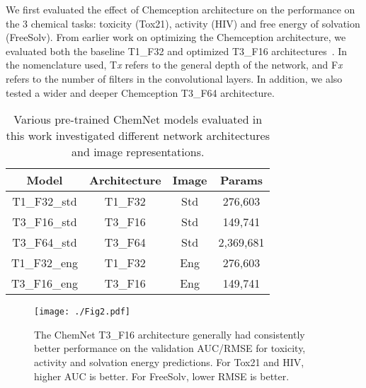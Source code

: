 \documentclass[sigconf]{acmart}
\begin{document}
We first evaluated the effect of Chemception architecture on the performance on the 3 chemical tasks: toxicity (Tox21), activity (HIV) and free energy of solvation (FreeSolv). From earlier work on optimizing the Chemception architecture, we evaluated both the baseline T1\_F32 and optimized T3\_F16 architectures~\cite{goh2017c1}. In the nomenclature used, T\textit{x} refers to the general depth of the network, and F\textit{x} refers to the number of filters in the convolutional layers. In addition, we also tested a wider and deeper Chemception T3\_F64 architecture.

\begin{table}[!t] 
		\begin{center}
		\begin{tabular}{|c|c|c|c|}
				\hline
				Model & Architecture & Image & Params \\
				\hline\hline
				T1\_F32\_std & T1\_F32 & Std & 276,603\\
				T3\_F16\_std & T3\_F16 & Std & 149,741\\
				T3\_F64\_std & T3\_F64 & Std & 2,369,681\\
				T1\_F32\_eng & T1\_F32 & Eng & 276,603\\
				T3\_F16\_eng & T3\_F16 & Eng & 149,741\\
				\hline
		\end{tabular} 
		\end{center}
\caption{Various pre-trained ChemNet models evaluated in this work investigated different network architectures and image representations.}
\label{table:2}
\end{table}

\begin{figure}[!htbp]
\centering
\texttt{[image: ./Fig2.pdf]}
\caption{\small The ChemNet T3\_F16 architecture generally had consistently better performance on the validation AUC/RMSE for toxicity, activity and solvation energy predictions. For Tox21 and HIV, higher AUC is better. For FreeSolv, lower RMSE is better.}
\label{fig:2}
\end{figure}
 
\end{document}
